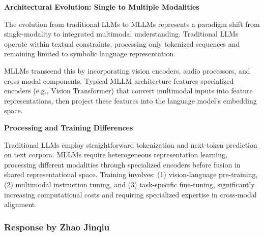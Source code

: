 \documentclass[12pt,a4paper]{article}
\begin{document}
\textbf{Architectural Evolution: Single to Multiple Modalities}

The evolution from traditional LLMs to MLLMs represents a paradigm shift from single-modality to integrated multimodal understanding. Traditional LLMs operate within textual constraints, processing only tokenized sequences and remaining limited to symbolic language representation.

MLLMs transcend this by incorporating vision encoders, audio processors, and cross-modal components. Typical MLLM architecture features specialized encoders (e.g., Vision Transformer) that convert multimodal inputs into feature representations, then project these features into the language model's embedding space.

\textbf{Processing and Training Differences}

Traditional LLMs employ straightforward tokenization and next-token prediction on text corpora. MLLMs require heterogeneous representation learning, processing different modalities through specialized encoders before fusion in shared representational space. Training involves: (1) vision-language pre-training, (2) multimodal instruction tuning, and (3) task-specific fine-tuning, significantly increasing computational costs and requiring specialized expertise in cross-modal alignment.

\subsubsection{Response by Zhao Jinqiu}
\end{document}
